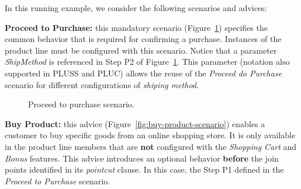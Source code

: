In this running example, we consider the following scenarios and advices:

{\bf Proceed to Purchase:} this mandatory scenario
(Figure~\ref{fig:proceed-to-checkout}) specifies the common behavior that is
required for confirming a purchase. Instances of the product line must be
configured with this scenario. Notice that a parameter
\emph{ShipMethod} is referenced in Step P2 of
Figure~\ref{fig:proceed-to-checkout}. This parameter (notation
also supported in PLUSS and PLUC) allows the reuse of the \emph{Proceed do
Purchase} scenario for different configurations of \emph{shiping method}.

\begin{figure}[h]
\caption{Proceed to purchase scenario.}
\label{fig:proceed-to-checkout}
\end{figure}

{\bf Buy Product:} this advice (Figure~\ref{fig:buy-product-scenario}) enables
a customer to buy specific goods from an online shopping store. It is only
available in the product line members that are {\bf not} configured with
the \emph{Shopping Cart} and \emph{Bonus} features.
This advice introduces an optional behavior {\bf before} the join points
identified in its \emph{pointcut} clause. In this case, the Step P1 defined in
the \emph{Proceed to Purchase} scenario.

